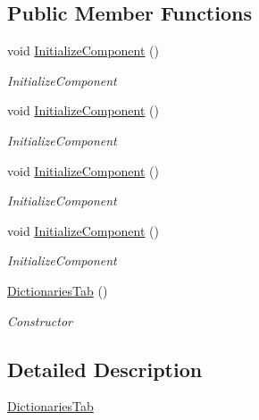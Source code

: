 \subsection*{Public Member Functions}
\begin{DoxyCompactItemize}
\item 
void \hyperlink{class_baudi_1_1_client_1_1_view_1_1_tabs_1_1_dictionaries_tab_a00070027e760a340d2a41c52ea522e21}{Initialize\+Component} ()
\begin{DoxyCompactList}\small\item\em Initialize\+Component \end{DoxyCompactList}\item 
void \hyperlink{class_baudi_1_1_client_1_1_view_1_1_tabs_1_1_dictionaries_tab_a00070027e760a340d2a41c52ea522e21}{Initialize\+Component} ()
\begin{DoxyCompactList}\small\item\em Initialize\+Component \end{DoxyCompactList}\item 
void \hyperlink{class_baudi_1_1_client_1_1_view_1_1_tabs_1_1_dictionaries_tab_a00070027e760a340d2a41c52ea522e21}{Initialize\+Component} ()
\begin{DoxyCompactList}\small\item\em Initialize\+Component \end{DoxyCompactList}\item 
void \hyperlink{class_baudi_1_1_client_1_1_view_1_1_tabs_1_1_dictionaries_tab_a00070027e760a340d2a41c52ea522e21}{Initialize\+Component} ()
\begin{DoxyCompactList}\small\item\em Initialize\+Component \end{DoxyCompactList}\item 
\hyperlink{class_baudi_1_1_client_1_1_view_1_1_tabs_1_1_dictionaries_tab_afbe9ce27b53dcbd474df58fdf33028f2}{Dictionaries\+Tab} ()
\begin{DoxyCompactList}\small\item\em Constructor \end{DoxyCompactList}\end{DoxyCompactItemize}


\subsection{Detailed Description}
\hyperlink{class_baudi_1_1_client_1_1_view_1_1_tabs_1_1_dictionaries_tab}{Dictionaries\+Tab} 

